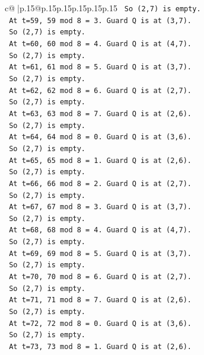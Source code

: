 \documentclass{article}
\begin{document}
{\begin{supertabular}{c@{$\;$}|p{.15\linewidth}@{}p{.15\linewidth}p{.15\linewidth}p{.15\linewidth}p{.15\linewidth}p{.15\linewidth}}
{{{\texttt{    So (2,7) is empty.} \\
\texttt{    At t=59, 59 mod 8 = 3. Guard Q is at (3,7).} \\
\texttt{    So (2,7) is empty.} \\
\texttt{    At t=60, 60 mod 8 = 4. Guard Q is at (4,7).} \\
\texttt{    So (2,7) is empty.} \\
\texttt{    At t=61, 61 mod 8 = 5. Guard Q is at (3,7).} \\
\texttt{    So (2,7) is empty.} \\
\texttt{    At t=62, 62 mod 8 = 6. Guard Q is at (2,7).} \\
\texttt{    So (2,7) is empty.} \\
\texttt{    At t=63, 63 mod 8 = 7. Guard Q is at (2,6).} \\
\texttt{    So (2,7) is empty.} \\
\texttt{    At t=64, 64 mod 8 = 0. Guard Q is at (3,6).} \\
\texttt{    So (2,7) is empty.} \\
\texttt{    At t=65, 65 mod 8 = 1. Guard Q is at (2,6).} \\
\texttt{    So (2,7) is empty.} \\
\texttt{    At t=66, 66 mod 8 = 2. Guard Q is at (2,7).} \\
\texttt{    So (2,7) is empty.} \\
\texttt{    At t=67, 67 mod 8 = 3. Guard Q is at (3,7).} \\
\texttt{    So (2,7) is empty.} \\
\texttt{    At t=68, 68 mod 8 = 4. Guard Q is at (4,7).} \\
\texttt{    So (2,7) is empty.} \\
\texttt{    At t=69, 69 mod 8 = 5. Guard Q is at (3,7).} \\
\texttt{    So (2,7) is empty.} \\
\texttt{    At t=70, 70 mod 8 = 6. Guard Q is at (2,7).} \\
\texttt{    So (2,7) is empty.} \\
\texttt{    At t=71, 71 mod 8 = 7. Guard Q is at (2,6).} \\
\texttt{    So (2,7) is empty.} \\
\texttt{    At t=72, 72 mod 8 = 0. Guard Q is at (3,6).} \\
\texttt{    So (2,7) is empty.} \\
\texttt{    At t=73, 73 mod 8 = 1. Guard Q is at (2,6).} \\
}}}
\end{supertabular}}
\end{document}
